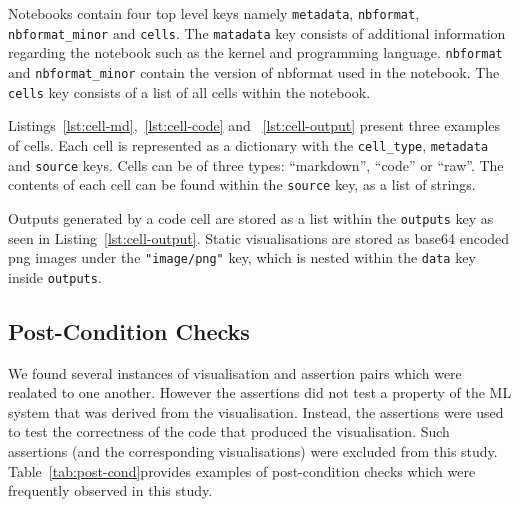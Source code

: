 \documentclass[acmsmall,screen,review,anonymous]{acmart}
\begin{document}
Notebooks contain four top level keys namely \texttt{metadata}, \texttt{nbformat}, \texttt{nbformat\_minor} and \texttt{cells}. The \texttt{matadata} key consists of additional information regarding the notebook such as the kernel and programming language. \texttt{nbformat} and \texttt{nbformat\_minor} contain the version of nbformat used in the notebook. The \texttt{cells} key consists of a list of all cells within the notebook.

Listings~\ref{lst:cell-md},~\ref{lst:cell-code} and ~\ref{lst:cell-output} present three examples of cells. Each cell is represented as a dictionary with the \texttt{cell\_type}, \texttt{metadata} and \texttt{source} keys. Cells can be of three types: ``markdown'', ``code'' or ``raw''. The contents of each cell can be found within the \texttt{source} key, as a list of strings.

Outputs generated by a code cell are stored as a list within the \texttt{outputs} key as seen in Listing~\ref{lst:cell-output}. Static visualisations are stored as base64 encoded png images under the \texttt{"image/png"} key, which is nested within the \texttt{data} key inside \texttt{outputs}.

\subsection{Post-Condition Checks}\label{sec:post-cond}

We found several instances of visualisation and assertion pairs which were realated to one another. However the assertions did not test a property of the ML system that was derived from the visualisation. Instead, the assertions were used to test the correctness of the code that produced the visualisation. Such assertions (and the corresponding visualisations) were excluded from this study. Table~\ref{tab:post-cond}provides examples of post-condition checks which were frequently observed in this study.
\end{document}

